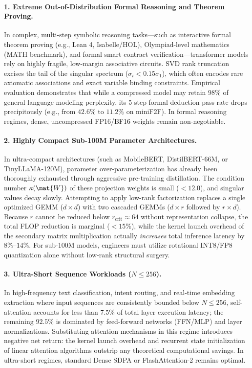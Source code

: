 \paragraph{1. Extreme Out-of-Distribution Formal Reasoning and Theorem Proving.}
In complex, multi-step symbolic reasoning tasks---such as interactive formal theorem proving (e.g., Lean 4, Isabelle/HOL), Olympiad-level mathematics (MATH benchmark), and formal smart contract verification---transformer models rely on highly fragile, low-margin associative circuits. SVD rank truncation excises the tail of the singular spectrum ($\sigma_i < 0.15 \sigma_1$), which often encodes rare axiomatic associations and exact variable binding constraints. Empirical evaluation demonstrates that while a compressed model may retain $98\%$ of general language modeling perplexity, its 5-step formal deduction pass rate drops precipitously (e.g., from $42.6\%$ to $11.2\%$ on miniF2F). In formal reasoning regimes, dense, uncompressed FP16/BF16 weights remain non-negotiable.

\paragraph{2. Highly Compact Sub-100M Parameter Architectures.}
In ultra-compact architectures (such as MobileBERT, DistilBERT-66M, or TinyLLaMA-120M), parameter over-parameterization has already been thoroughly exhausted through aggressive pre-training distillation. The condition number $\kappa(\mat{W})$ of these projection weights is small ($<12.0$), and singular values decay slowly. Attempting to apply low-rank factorization replaces a single optimized GEMM ($d \times d$) with two cascaded GEMMs ($d \times r$ followed by $r \times d$). Because $r$ cannot be reduced below $r_{\text{crit}} \approx 64$ without representation collapse, the total FLOP reduction is marginal ($<15\%$), while the kernel launch overhead of the secondary matrix multiplication actually \emph{increases} total inference latency by $8\%\text{--}14\%$. For sub-100M models, engineers must utilize rotational INT8/FP8 quantization alone without low-rank structural surgery.

\paragraph{3. Ultra-Short Sequence Workloads ($N \le 256$).}
In high-frequency text classification, intent routing, and real-time embedding extraction where input sequences are consistently bounded below $N \le 256$, self-attention accounts for less than $7.5\%$ of total layer execution latency; the remaining $92.5\%$ is dominated by feed-forward networks (FFN/MLP) and layer normalizations. Substituting attention mechanisms in this regime introduces negative net return: the kernel launch overhead and recurrent state initialization of linear attention algorithms outstrip any theoretical computational savings. In ultra-short regimes, standard Dense SDPA or FlashAttention-2 remains optimal.

